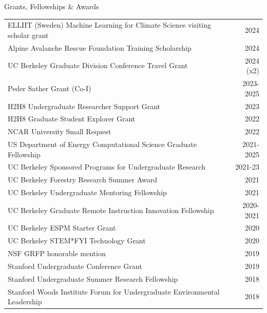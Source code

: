\documentclass{cv}
\begin{document}
\begin{cSection}{Grants, Fellowships \& Awards}
\vspace{1.6em}
\renewcommand{\arraystretch}{1.2}
\begin{tabularx}{.98\textwidth}{X r}
ELLIIT (Sweden) Machine Learning for Climate Science visiting scholar grant & 2024 \\ %
Alpine Avalanche Rescue Foundation Training Scholarship & 2024 \\ %
UC Berkeley Graduate Division Conference Travel Grant & 2024 (x2) \\ %
Peder Sather Grant (Co-I) & 2023-2025 \\ %
H2H8 Undergraduate Researcher Support Grant & 2023 \\ %
H2H8 Graduate Student Explorer Grant & 2022 \\ %
NCAR University Small Request & 2022 \\ %
US Department of Energy Computational Science Graduate Fellowship & 2021-2025 \\ %
UC Berkeley Sponsored Programs for Undergraduate Research & 2021-23 \\ %
UC Berkeley Forestry Research Summer Award & 2021 \\ %
UC Berkeley Undergraduate Mentoring Fellowship & 2021 \\ %
UC Berkeley Graduate Remote Instruction Innovation Fellowship & 2020-2021 \\ %
UC Berkeley ESPM Starter Grant & 2020 \\ %
UC Berkeley STEM*FYI Technology Grant & 2020 \\ %
NSF GRFP honorable mention & 2019 \\
Stanford Undergraduate Conference Grant & 2019 \\ %
Stanford Undergraduate Summer Research Fellowship & 2018 \\ %
Stanford Woods Institute Forum for Undergraduate Environmental Leadership & 2018 \\
\end{tabularx}
\end{cSection}
\end{document}
